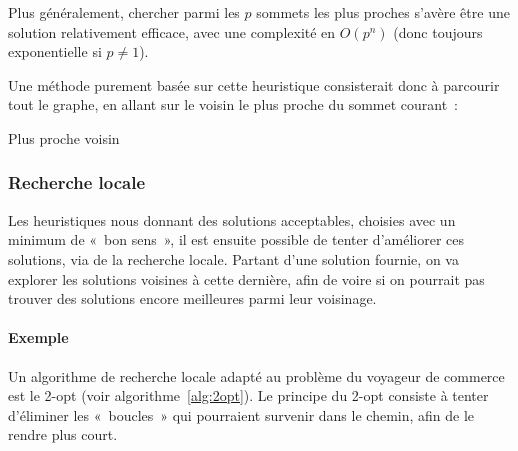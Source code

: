     Plus généralement, chercher parmi les $p$ sommets les plus proches s'avère
    être une solution relativement efficace, avec une complexité en $O(p^n)$
    (donc toujours exponentielle si $p \neq 1$).

    Une méthode purement basée sur cette heuristique consisterait donc à parcourir
    tout le graphe, en allant sur le voisin le plus proche du sommet courant~:

    \begin{algorithm}
      \label{alg:voisin}
      \caption{Plus proche voisin}
    \end{algorithm}

  \subsubsection{Recherche locale}
    Les heuristiques nous donnant des solutions acceptables, choisies avec un
    minimum de «~bon sens~», il est ensuite possible de tenter d'améliorer
    ces solutions, via de la recherche locale.
    Partant d'une solution fournie, on va explorer les solutions voisines
    à cette dernière, afin de voire si on pourrait pas trouver des solutions
    encore meilleures parmi leur voisinage.

    \paragraph{Exemple} Un algorithme de recherche locale adapté au problème
    du voyageur de commerce est le 2-opt (voir algorithme~\ref{alg:2opt}).
    Le principe du 2-opt consiste à tenter d'éliminer les «~boucles~» qui
    pourraient survenir dans le chemin, afin de le rendre plus court.
    \cite{two_opt}

